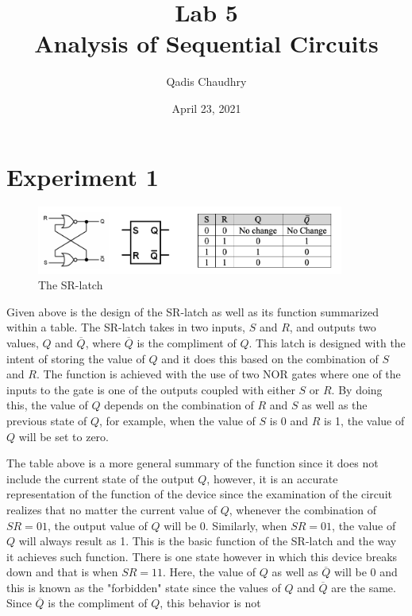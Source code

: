 \documentclass[12pt]{article}
\title{Lab 5 \\ Analysis of Sequential Circuits}
\author{Qadis Chaudhry}
\date{April 23, 2021}
\begin{document}
\maketitle
    \section*{Experiment 1}
    \begin{figure}[h]
        \centering
        \includegraphics[width=0.9\textwidth]{SRLatch.png}
        \caption{The SR-latch}
    \end{figure}
    \par Given above is the design of the SR-latch as well as its function
    summarized within a table. The SR-latch takes in two inputs, $S$ and $R$,
    and outputs two values, $Q$ and $\overline{Q}$, where $\overline{Q}$ is the
    compliment of $Q$. This latch is designed with the intent of storing the
    value of $Q$ and it does this based on the combination of $S$ and $R$.  The
    function is achieved with the use of two NOR gates where one of the inputs
    to the gate is one of the outputs coupled with either $S$ or $R$. By doing
    this, the value of $Q$ depends on the combination of $R$ and $S$ as well as
    the previous state of $Q$, for example, when the value of $S$ is 0 and $R$
    is 1, the value of $Q$ will be set to zero.
    \par The table above is a more general summary of the function since it does
    not include the current state of the output $Q$, however, it is an accurate
    representation of the function of the device since the examination of the
    circuit realizes that no matter the current value of $Q$, whenever the
    combination of $S R = 01$, the output value of $Q$ will be 0.  Similarly,
    when $S R = 01$, the value of $Q$ will always result as 1. This is the basic
    function of the SR-latch and the way it achieves such function. There is one
    state however in which this device breaks down and that is when $S R = 11$.
    Here, the value of $Q$ as well as $\overline{Q}$ will be 0 and this is known
    as the "forbidden" state since the values of $Q$ and $\overline{Q}$ are the
    same.  Since $\overline{Q}$ is the compliment of $Q$, this behavior is not
\end{document}
